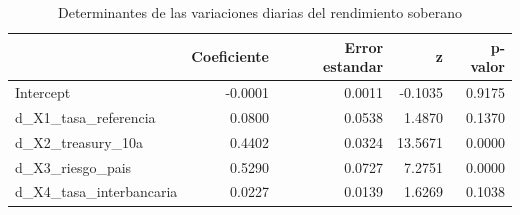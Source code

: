 \begin{table}
\caption{Determinantes de las variaciones diarias del rendimiento soberano}
\label{tab:tabla4_variaciones}
\begin{tabular}{lrrrr}
\toprule
 & Coeficiente & Error estandar & z & p-valor \\
\midrule
Intercept & -0.0001 & 0.0011 & -0.1035 & 0.9175 \\
d_X1_tasa_referencia & 0.0800 & 0.0538 & 1.4870 & 0.1370 \\
d_X2_treasury_10a & 0.4402 & 0.0324 & 13.5671 & 0.0000 \\
d_X3_riesgo_pais & 0.5290 & 0.0727 & 7.2751 & 0.0000 \\
d_X4_tasa_interbancaria & 0.0227 & 0.0139 & 1.6269 & 0.1038 \\
\bottomrule
\end{tabular}
\end{table}
